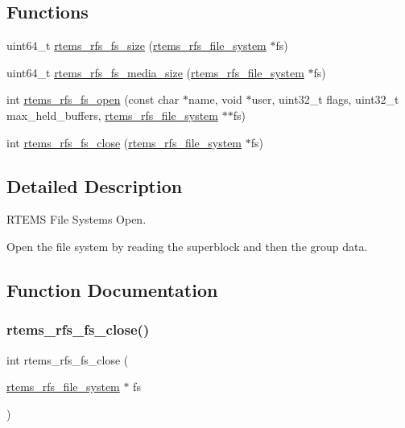 \subsection*{Functions}
\begin{DoxyCompactItemize}
\item 
uint64\+\_\+t \mbox{\hyperlink{rtems-rfs-file-system_8c_a0c8274793080a83d483e966475ccc2a5}{rtems\+\_\+rfs\+\_\+fs\+\_\+size}} (\mbox{\hyperlink{struct__rtems__rfs__file__system}{rtems\+\_\+rfs\+\_\+file\+\_\+system}} $\ast$fs)
\item 
uint64\+\_\+t \mbox{\hyperlink{rtems-rfs-file-system_8c_a8380bd35ff8e755dc1fe18f2de156f3c}{rtems\+\_\+rfs\+\_\+fs\+\_\+media\+\_\+size}} (\mbox{\hyperlink{struct__rtems__rfs__file__system}{rtems\+\_\+rfs\+\_\+file\+\_\+system}} $\ast$fs)
\item 
int \mbox{\hyperlink{rtems-rfs-file-system_8c_a33a063dea6be2f3fe7c5f4f9de07dd0c}{rtems\+\_\+rfs\+\_\+fs\+\_\+open}} (const char $\ast$name, void $\ast$user, uint32\+\_\+t flags, uint32\+\_\+t max\+\_\+held\+\_\+buffers, \mbox{\hyperlink{struct__rtems__rfs__file__system}{rtems\+\_\+rfs\+\_\+file\+\_\+system}} $\ast$$\ast$fs)
\item 
int \mbox{\hyperlink{rtems-rfs-file-system_8c_af161538fcc5d88a33ec4b74ce530ae93}{rtems\+\_\+rfs\+\_\+fs\+\_\+close}} (\mbox{\hyperlink{struct__rtems__rfs__file__system}{rtems\+\_\+rfs\+\_\+file\+\_\+system}} $\ast$fs)
\end{DoxyCompactItemize}


\subsection{Detailed Description}
R\+T\+E\+MS File Systems Open. 

Open the file system by reading the superblock and then the group data. 

\subsection{Function Documentation}
\mbox{\label{rtems-rfs-file-system_8c_af161538fcc5d88a33ec4b74ce530ae93}} 
\subsubsection{\texorpdfstring{rtems\_rfs\_fs\_close()}{rtems\_rfs\_fs\_close()}}
{\footnotesize\ttfamily int rtems\+\_\+rfs\+\_\+fs\+\_\+close (\begin{DoxyParamCaption}\item[{\mbox{\hyperlink{struct__rtems__rfs__file__system}{rtems\+\_\+rfs\+\_\+file\+\_\+system}} $\ast$}]{fs }\end{DoxyParamCaption})}

